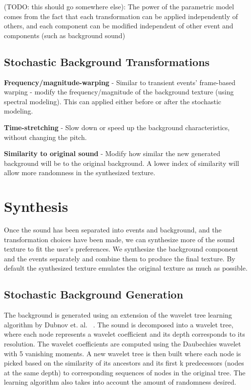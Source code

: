 \documentclass{acmsiggraph}               %
\begin{document}
(TODO: this should go somewhere else): The power of the parametric model comes from the 
fact that each transformation can be applied independently of others, and each component can 
be modified independent of other event and components (such as background sound)


\subsection{Stochastic Background Transformations}

\textbf{Frequency/magnitude-warping} - Similar to transient events' frame-based 
warping - modify the frequency/magnitude of the background texture (using spectral
modeling).  This can applied either before or after the stochastic modeling.

\textbf{Time-stretching} - Slow down or speed up the background characteristics, without 
changing the pitch.

\textbf{Similarity to original sound} - Modify how similar the new generated background
will be to the original background.  A lower index of similarity will allow more randomness
in the synthesized texture.



\section{Synthesis}

Once the sound has been separated into events and background, and the
transformation choices have been made, we can synthesize more of the sound
texture to fit the user's preferences. We synthesize the background 
component and the events separately and combine them to produce the 
final texture. By default the synthesized texture emulates the original texture as much 
as possible.

\subsection{Stochastic Background Generation}

The background is generated using an extension of the wavelet tree 
learning algorithm by Dubnov et. al. ~. The sound is 
decomposed into a wavelet tree, where each node represents a wavelet 
coefficient and its depth corresponds to its resolution.  The wavelet 
coefficients are computed using the Daubechies wavelet with 5 vanishing 
moments. A new wavelet tree is then built where each node is picked 
based on the similarity of its ancestors and its first k predecessors 
(nodes at the same depth) to corresponding sequences of nodes in the 
original tree. The learning algorithm also takes into account the amount of 
randomness desired.
\end{document}
